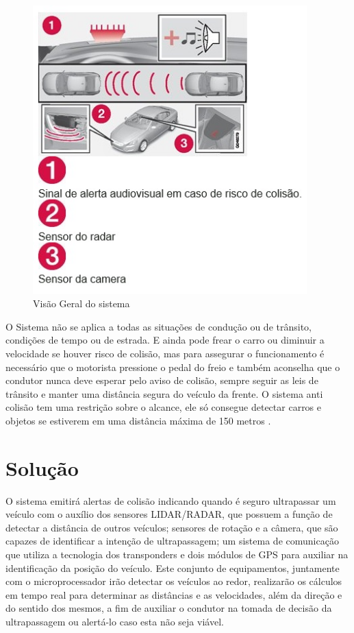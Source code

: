 \begin{figure}[h]
  \centering
  \includegraphics[width=400px, scale=1]{figuras/visao_geral}
  \caption{Visão Geral do sistema}
\label{fig:visao_geral}
\end{figure}

O Sistema não se aplica a todas as situações de condução ou de trânsito, condições de tempo ou de estrada. E ainda pode frear o carro ou diminuir a velocidade se houver risco de colisão, mas para assegurar o funcionamento é necessário que o motorista pressione o pedal do freio e também aconselha que o condutor nunca deve esperar pelo aviso de colisão, sempre seguir as leis de trânsito e manter uma distância segura do veículo da frente. 
O sistema anti colisão tem uma restrição sobre o alcance, ele só consegue detectar carros e objetos se estiverem em uma distância máxima de 150 metros \cite{volvo_system}. 

\section{Solução}

O sistema emitirá alertas de colisão indicando quando é seguro ultrapassar um veículo com o auxílio dos sensores LIDAR/RADAR, que possuem a função de detectar a distância de outros veículos; sensores de rotação e a câmera, que são capazes de identificar a intenção de ultrapassagem; um sistema de comunicação que utiliza a tecnologia dos transponders e dois módulos de GPS para auxiliar na identificação da posição do veículo. Este conjunto de equipamentos, juntamente com o microprocessador irão detectar os veículos ao redor, realizarão os cálculos em tempo real para determinar as distâncias e as velocidades, além da direção e do sentido dos mesmos, a fim de auxiliar o condutor na tomada de decisão da ultrapassagem ou alertá-lo caso esta não seja viável.

